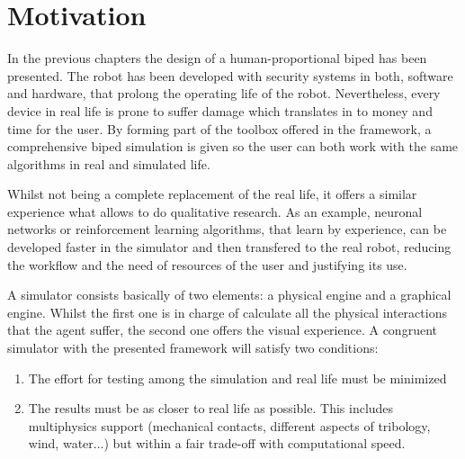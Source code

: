\section{Motivation} %
\label{sec:sim_motivation}
In the previous chapters the design of a human-proportional biped has been presented. 
The robot has been developed with security systems in both, software and hardware, that prolong the operating life of the robot. 
Nevertheless, every device in real life is prone to suffer damage which translates in to money and time for the user.
By forming part of the toolbox offered in the framework, a comprehensive biped simulation is given so the user can both work with the same algorithms in real and simulated life.

Whilst not being a complete replacement of the real life, it offers a similar experience what allows to do qualitative research.
As an example, neuronal networks or reinforcement learning algorithms, that learn by experience, can be developed faster in the simulator and then transfered to the real robot, reducing the workflow and the need of resources of the user and justifying its use.

A simulator consists basically of two elements: a physical engine and a graphical engine.
Whilst the first one is in charge of calculate all the physical interactions that the agent suffer, the second one offers the visual experience.
A congruent simulator with the presented framework will satisfy two conditions:
\begin{enumerate}
  \item The effort for testing among the simulation and real life must be minimized
  \item The results must be as closer to real life as possible. This includes multiphysics support (mechanical contacts, different aspects of tribology, wind, water...) but within a fair trade-off with computational speed.
\end{enumerate}

